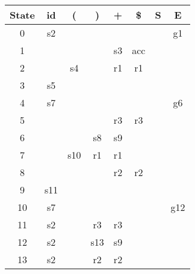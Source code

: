 \begin{center}
    \begin{latin}
    \begin{tabular}{|c|c|c|c|c|c|c|c|}
    \hline
    State & id & ( & ) & + & \$ & S & E \\ \hline
    0     & s2 &   &   &   &    &   & g1\\ \hline
    1     &    &   &   & s3& acc&   &   \\ \hline
    2     &    & s4&   & r1& r1 &   &   \\ \hline
    3     & s5 &   &   &   &    &   &   \\ \hline
    4     & s7 &   &   &   &    &   & g6\\ \hline
    5     &    &   &   & r3& r3 &   &   \\ \hline
    6     &    &   & s8& s9&    &   &   \\ \hline
    7     &    &s10& r1& r1&    &   &   \\ \hline
    8     &    &   &   & r2& r2 &   &   \\ \hline
    9     & s11&   &   &   &    &   &   \\ \hline
    10    & s7 &   &   &   &    &   &g12\\ \hline
    11    & s2 &   & r3& r3&    &   &   \\ \hline
    12    & s2 &   &s13& s9&    &   &   \\ \hline
    13    & s2 &   & r2& r2&    &   &   \\ \hline
    \end{tabular}
    \end{latin}
\end{center}

